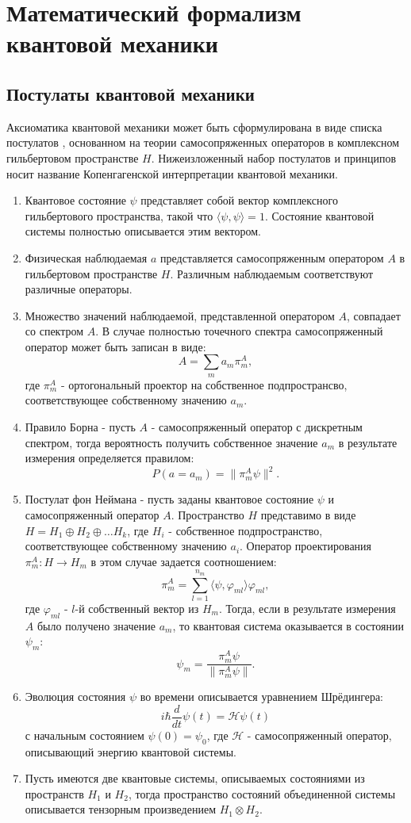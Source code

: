 \documentclass[%
master,         %
subf,           %
href,           %
colorlinks=true %
]{disser}
\numberwithin{equation}{section}
\numberwithin{figure}{section}
\begin{document}
\section{Математический формализм квантовой механики}
\subsection{Постулаты квантовой механики}
Аксиоматика квантовой механики может быть сформулирована в виде списка постулатов \cite{Khrennikov_information}, основанном на теории самосопряженных операторов в комплексном гильбертовом пространстве $H$. Нижеизложенный набор постулатов и принципов носит название Копенгагенской интерпретации квантовой механики.
\begin{enumerate}[label=\bfseries Постулат \arabic*:, align=left]
  \item Квантовое состояние $\psi$ представляет собой вектор комплексного гильбертового пространства, такой что $\langle\psi, \psi\rangle = 1$. Состояние квантовой системы полностью описывается этим вектором.
  \item Физическая наблюдаемая $a$ представляется самосопряженным оператором $A$ в гильбертовом пространстве $H$. Различным наблюдаемым соответствуют различные операторы.
  \item Множество значений наблюдаемой, представленной оператором $A$, совпадает со спектром $A$. В случае полностью точечного спектра самосопряженный оператор может быть записан в виде:
  \[
  A = \sum_m a_m\pi_m^A,
  \]
    где $\pi_m^A$ - ортогональный проектор на собственное подпространсво, соответствующее собственному значению $a_m$.
  \item Правило Борна - пусть $A$ - самосопряженный оператор с дискретным спектром, тогда вероятность получить собственное значение $a_m$ в результате измерения определяется правилом:
  \[
  P(a = a_m) = \| \pi_m^A\psi\|^2.
  \]
  \item Постулат фон Неймана - пусть заданы квантовое состояние $\psi$ и самосопряженный оператор $A$. Пространство $H$ представимо в виде $H = H_1\oplus H_2\oplus\ldots H_k$, где $H_i$ - собственное подпространство, соответствующее собственному значению $a_i$. Оператор проектирования $\pi_m^A: H\to H_m$ в этом случае задается соотношением: 
  \[
  \pi_m^A = \sum_{l = 1}^{n_m}\langle\psi,\varphi_{ml}\rangle\varphi_{ml},
  \]
  где $\varphi_{ml}$ - $l$-й собственный вектор из $H_m$.
  Тогда, если в результате измерения $A$  было получено значение $a_m$, то квантовая система оказывается в состоянии $\psi_m$:
  \[
  \psi_m = \frac{\pi_m^A\psi}{ \| \pi_m^A\psi\|}.
  \] 
  \item Эволюция состояния $\psi$ во времени описывается уравнением Шрёдингера:
  \[
  i\hbar \dfrac{d}{dt}\psi(t) = \mathcal{\mathcal{H}}\psi(t)
  \] 
  с начальным состоянием $\psi(0) = \psi_0$, 
  где $\mathcal{H}$  - самосопряженный оператор, описывающий энергию квантовой системы. 
  \item Пусть имеются две квантовые системы, описываемых состояниями из пространств $H_1$ и $H_2$, тогда пространство состояний объединенной системы описывается тензорным произведением $H_1 \otimes H_2$.  
\end{enumerate}
\end{document}
